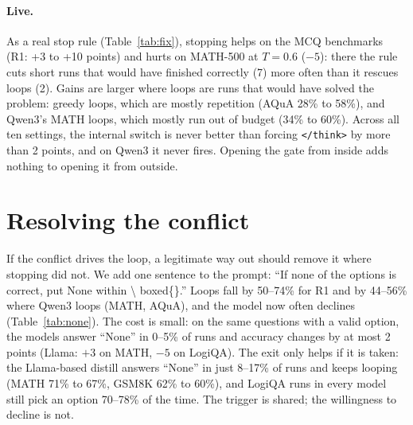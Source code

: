 \documentclass[11pt]{article}
\newcommand{\think}{\texttt{</think>}}
\begin{document}
\paragraph{Live.} As a real stop rule (Table~\ref{tab:fix}), stopping helps on the MCQ benchmarks
(R1: +3 to +10 points) and hurts on MATH-500 at $T{=}0.6$ ($-5$): there the rule cuts short runs that
would have finished correctly (7) more often than it rescues loops (2). Gains are larger where loops
are runs that would have solved the problem: greedy loops, which are mostly repetition (AQuA 28\% to
58\%), and Qwen3's MATH loops, which mostly run out of budget (34\% to 60\%). Across all ten settings,
the internal switch is never better than forcing \think{} by more than 2 points, and on Qwen3 it never
fires. Opening the gate from inside adds nothing to opening it from outside.

\section{Resolving the conflict}
\label{sec:resolve}

\begin{table}[t]
\centering
\small
\setlength{\tabcolsep}{4pt}
\caption{Allowing ``None'': loop rate (\%) without $\to$ with the added sentence, and the share of runs
answering ``None'' (2 seeds each).}
\label{tab:none}
\end{table}

If the conflict drives the loop, a legitimate way out should remove it where stopping did not. We add
one sentence to the prompt: ``If none of the options is correct, put None within \textbackslash
boxed\{\}.'' Loops fall by 50--74\% for R1 and by 44--56\% where Qwen3 loops (MATH, AQuA), and the model now often declines
(Table~\ref{tab:none}). The cost is small: on the same questions with a valid option, the models answer
``None'' in 0--5\% of runs and accuracy changes by at most 2 points (Llama: $+3$ on MATH, $-5$ on LogiQA). The exit only helps
if it is taken: the Llama-based distill answers ``None'' in just 8--17\% of runs and keeps looping (MATH 71\%
to 67\%, GSM8K 62\% to 60\%), and LogiQA runs in every model still pick an option 70--78\% of the time.
The trigger is shared; the willingness to decline is not.
\end{document}
